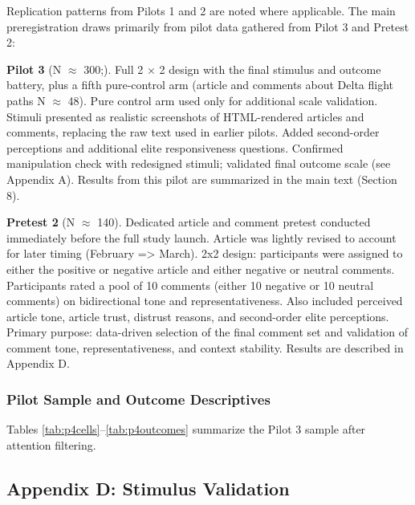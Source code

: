 \documentclass[
  12pt]{article}
\begin{document}
Replication patterns from Pilots 1 and 2 are noted where applicable. The
main preregistration draws primarily from pilot data gathered from Pilot
3 and Pretest 2:

\textbf{Pilot 3} (N \(\approx\) 300;). Full 2 × 2 design with the final
stimulus and outcome battery, plus a fifth pure-control arm (article and
comments about Delta flight paths N \(\approx\) 48). Pure control arm
used only for additional scale validation. Stimuli presented as
realistic screenshots of HTML-rendered articles and comments, replacing
the raw text used in earlier pilots. Added second-order perceptions and
additional elite responsiveness questions. Confirmed manipulation check
with redesigned stimuli; validated final outcome scale (see Appendix A).
Results from this pilot are summarized in the main text (Section 8).

\textbf{Pretest 2} (N \(\approx\) 140). Dedicated article and comment
pretest conducted immediately before the full study launch. Article was
lightly revised to account for later timing (February =\textgreater{}
March). 2x2 design: participants were assigned to either the positive or
negative article and either negative or neutral comments. Participants
rated a pool of 10 comments (either 10 negative or 10 neutral comments)
on bidirectional tone and representativeness. Also included perceived
article tone, article trust, distrust reasons, and second-order elite
perceptions. Primary purpose: data-driven selection of the final comment
set and validation of comment tone, representativeness, and context
stability. Results are described in Appendix D.

\subsubsection{Pilot Sample and Outcome
Descriptives}\label{pilot-sample-and-outcome-descriptives}

Tables \ref{tab:p4cells}--\ref{tab:p4outcomes} summarize the Pilot 3
sample after attention filtering.







\subsection{Appendix D: Stimulus
Validation}\label{appendix-d-stimulus-validation}
\end{document}
